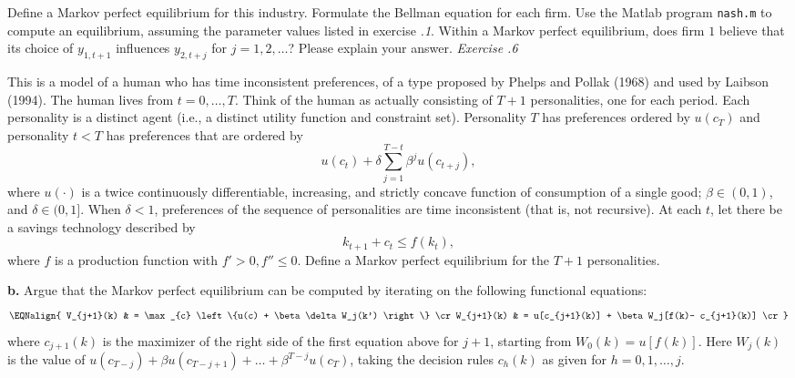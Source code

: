 \medskip
{}  Define a Markov perfect equilibrium for
this industry.
\medskip
{}  Formulate the Bellman equation for each firm.
\medskip
{}  Use the Matlab program {\tt nash.m} to compute
an equilibrium, assuming the parameter values  listed in
exercise {\it \the\chapternum.1\/}. 
\medskip
{} Within a Markov perfect equilibrium, does firm $1$ believe that its choice of $y_{1,t+1}$ influences $y_{2,t+j}$
for $j = 1, 2, \ldots$? Please explain your answer.
\medskip {} 
 
\noindent
{\it Exercise \the\chapternum.6} 

\medskip\noindent
This is a model of a human who  has time inconsistent preferences,
 of a type proposed by Phelps and Pollak (1968) and used by
Laibson (1994).
The human lives from $t=0, \ldots, T$.  Think of the human as
actually consisting of $T+1$  personalities, one for each period.
Each personality is a distinct agent (i.e., a distinct utility
function and constraint set).  Personality $T$ has preferences
ordered by $u(c_T)$ and personality $t < T$
has preferences that are ordered by
$$ u(c_t) + \delta \sum_{j=1}^{T-t} \beta^j u(c_{t+j}), $$ %
where $u(\cdot)$ is a twice continuously differentiable,
increasing, and strictly concave function of consumption of
a single good; $\beta \in (0,1)$, and $\delta \in (0,1]$.  When
$\delta <1$, preferences of the sequence of personalities
are time inconsistent (that is, not recursive).
At each $t$, let there be a savings technology described by
$$ k_{t+1} + c_t \leq f(k_t), $$ %
where $f$ is a production function with $f' >0, f''\leq 0$.
\medskip
{} Define a Markov perfect equilibrium for the
$T+1$ personalities.

\medskip
\noindent
{\bf b.} Argue that the Markov perfect equilibrium can be computed
by iterating on the following functional equations:
$$ \EQNalign{ V_{j+1}(k) & = \max_{c} \left\{u(c) + \beta
            \delta W_j(k') \right\}  \cr %
          W_{j+1}(k) & = u[c_{j+1}(k)] + \beta W_j[f(k)- c_{j+1}(k)] \cr}$$
where $c_{j+1}(k)$ is the maximizer of the right side of
the first equation above  %
for $j+1$, starting from $W_0(k) = u[f(k)]$.
Here $W_j(k)$ is the value of $u(c_{T-j}) + \beta u(c_{T-j+1}) +
\ldots + \beta^{T-j} u(c_T)$, taking the decision
rules $c_h(k)$ as given for $h=0, 1, \ldots, j$.

